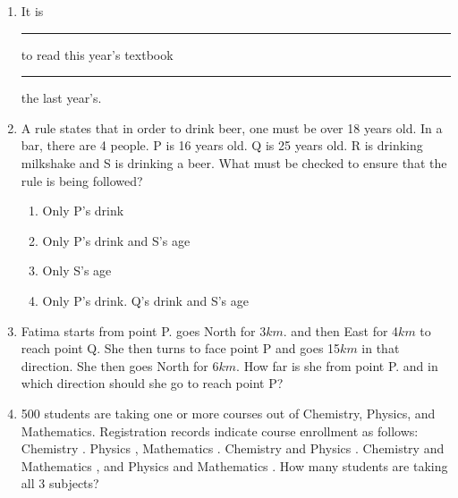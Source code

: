 \documentclass[journal,12pt,onecolumn]{IEEEtran}
\theoremstyle{remark}
\begin{document}
\begin{enumerate}
\begin{enumerate}
\end{enumerate}
\item It is \rule{2cm}{0.15mm} to read this year's textbook \rule{2cm}{0.15mm} the last year's.
\begin{enumerate}
\end{enumerate}
\item A rule states that in order to drink beer, one must be over 18 years old. In a bar, there are 4 people. P is 16 years old. Q is 25 years old. R is drinking milkshake and S is drinking a beer. What must be checked to ensure that the rule is being followed?
\begin{enumerate}
\item Only P's drink
\item Only P's drink and S's age
\item Only S's age
\item Only P's drink. Q's drink and S's age
\end{enumerate}
\item Fatima starts from point P. goes North for 3$km$. and then East for 4$km$ to reach point Q. She then turns to face point P and goes 15$km$ in that direction. She then goes North for 6$km$. How far is she from point P. and in which direction should she go to reach point P?
\begin{enumerate}
\end{enumerate}
\item 500 students are taking one or more courses out of Chemistry, Physics, and Mathematics. Registration records indicate course enrollment as follows: Chemistry . Physics , Mathematics . Chemistry and Physics . Chemistry and Mathematics , and Physics and Mathematics . How many students are taking all 3 subjects?

\end{enumerate}
\end{document}

